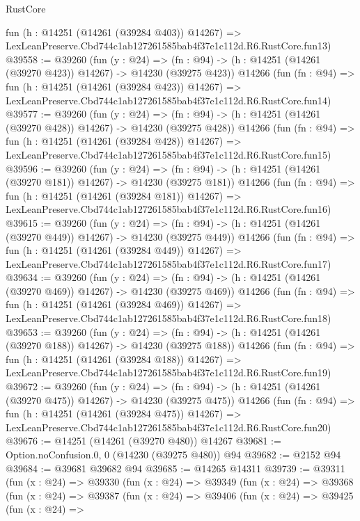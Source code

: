 \begin{lexlean}{RustCore}
\begin{coremodule}
    fun (h : @14251 (@14261 (@39284 @403)) @14267) =>
    LexLeanPreserve.Cbd744c1ab127261585bab4f37e1c112d.R6.RustCore.fun13)
@39558 := @39260
    (fun (y : @24) =>
    (fn : @94) -> (h : @14251 (@14261 (@39270 @423)) @14267) -> @14230 (@39275 @423))
    @14266
    (fun (fn : @94) =>
    fun (h : @14251 (@14261 (@39284 @423)) @14267) =>
    LexLeanPreserve.Cbd744c1ab127261585bab4f37e1c112d.R6.RustCore.fun14)
@39577 := @39260
    (fun (y : @24) =>
    (fn : @94) -> (h : @14251 (@14261 (@39270 @428)) @14267) -> @14230 (@39275 @428))
    @14266
    (fun (fn : @94) =>
    fun (h : @14251 (@14261 (@39284 @428)) @14267) =>
    LexLeanPreserve.Cbd744c1ab127261585bab4f37e1c112d.R6.RustCore.fun15)
@39596 := @39260
    (fun (y : @24) =>
    (fn : @94) -> (h : @14251 (@14261 (@39270 @181)) @14267) -> @14230 (@39275 @181))
    @14266
    (fun (fn : @94) =>
    fun (h : @14251 (@14261 (@39284 @181)) @14267) =>
    LexLeanPreserve.Cbd744c1ab127261585bab4f37e1c112d.R6.RustCore.fun16)
@39615 := @39260
    (fun (y : @24) =>
    (fn : @94) -> (h : @14251 (@14261 (@39270 @449)) @14267) -> @14230 (@39275 @449))
    @14266
    (fun (fn : @94) =>
    fun (h : @14251 (@14261 (@39284 @449)) @14267) =>
    LexLeanPreserve.Cbd744c1ab127261585bab4f37e1c112d.R6.RustCore.fun17)
@39634 := @39260
    (fun (y : @24) =>
    (fn : @94) -> (h : @14251 (@14261 (@39270 @469)) @14267) -> @14230 (@39275 @469))
    @14266
    (fun (fn : @94) =>
    fun (h : @14251 (@14261 (@39284 @469)) @14267) =>
    LexLeanPreserve.Cbd744c1ab127261585bab4f37e1c112d.R6.RustCore.fun18)
@39653 := @39260
    (fun (y : @24) =>
    (fn : @94) -> (h : @14251 (@14261 (@39270 @188)) @14267) -> @14230 (@39275 @188))
    @14266
    (fun (fn : @94) =>
    fun (h : @14251 (@14261 (@39284 @188)) @14267) =>
    LexLeanPreserve.Cbd744c1ab127261585bab4f37e1c112d.R6.RustCore.fun19)
@39672 := @39260
    (fun (y : @24) =>
    (fn : @94) -> (h : @14251 (@14261 (@39270 @475)) @14267) -> @14230 (@39275 @475))
    @14266
    (fun (fn : @94) =>
    fun (h : @14251 (@14261 (@39284 @475)) @14267) =>
    LexLeanPreserve.Cbd744c1ab127261585bab4f37e1c112d.R6.RustCore.fun20)
@39676 := @14251 (@14261 (@39270 @480)) @14267
@39681 := Option.noConfusion.{0, 0} (@14230 (@39275 @480)) @94
@39682 := @2152 @94
@39684 := @39681 @39682 @94
@39685 := @14265 @14311
@39739 := @39311
    (fun (x : @24) =>
    @39330
      (fun (x : @24) =>
      @39349
        (fun (x : @24) =>
        @39368
          (fun (x : @24) =>
          @39387
            (fun (x : @24) =>
            @39406
              (fun (x : @24) =>
              @39425
                (fun (x : @24) =>

\end{coremodule}
\end{lexlean}
